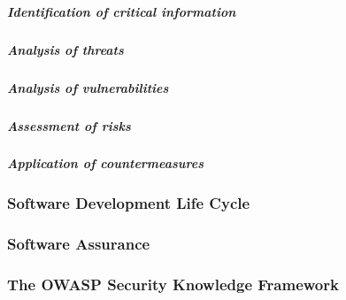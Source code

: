 \subparagraph{Identification of critical information}

\subparagraph{Analysis of threats}

\subparagraph{Analysis of vulnerabilities}

\subparagraph{Assessment of risks}

\subparagraph{Application of countermeasures}

\subsubsection{Software Development Life Cycle}

\subsubsection{Software Assurance}
\subsubsection{The OWASP Security Knowledge Framework}

